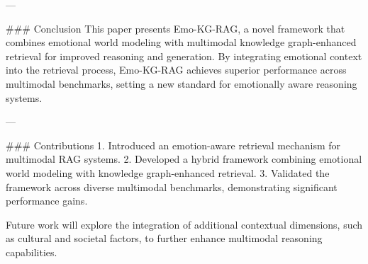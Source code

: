 ---

### Conclusion  
This paper presents Emo-KG-RAG, a novel framework that combines emotional world modeling with multimodal knowledge graph-enhanced retrieval for improved reasoning and generation. By integrating emotional context into the retrieval process, Emo-KG-RAG achieves superior performance across multimodal benchmarks, setting a new standard for emotionally aware reasoning systems.

---

### Contributions  
1. Introduced an emotion-aware retrieval mechanism for multimodal RAG systems.  
2. Developed a hybrid framework combining emotional world modeling with knowledge graph-enhanced retrieval.  
3. Validated the framework across diverse multimodal benchmarks, demonstrating significant performance gains.  

Future work will explore the integration of additional contextual dimensions, such as cultural and societal factors, to further enhance multimodal reasoning capabilities.
